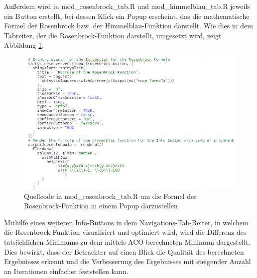 Außerdem wird in mod\_rosenbrock\_tab.R und mod\_himmelblau\_tab.R jeweils ein Button erstellt, bei dessen Klick ein Popup erscheint, das die mathematische Formel der Rosenbrock bzw. der Himmelblau-Funktion darstellt. Wie dies in dem Tabreiter, der die Rosenbrock-Funktion darstellt, umgesetzt wird, zeigt Abbildung \ref{fig:server_mod_rosenbrock_tab_actionbutton}.

\begin{figure}[H]
 \centering
 \includegraphics{"images/04_Visualisierung_des_Algorithmus/server_mod_rosenbrock_tab_actionbutton"}
 \caption{Quellcode in mod\_rosenbrock\_tab.R um die Formel der Rosenbrock-Funktion in einem Popup darzustellen}
 \label{fig:server_mod_rosenbrock_tab_actionbutton}
\end{figure}

Mithilfe eines weiteren Info-Buttons in dem Navigations-Tab-Reiter, in welchem die Rosenbrock-Funktion visualisiert und optimiert wird, wird die Differenz des tatsächlichen Minimums zu dem mittels ACO berechneten Minimum dargestellt. Dies bewirkt, dass der Betrachter auf einen Blick die Qualität des berechneten Ergebnisses erkennt und die Verbesserung des Ergebnisses mit steigender Anzahl an Iterationen einfacher feststellen kann.  

